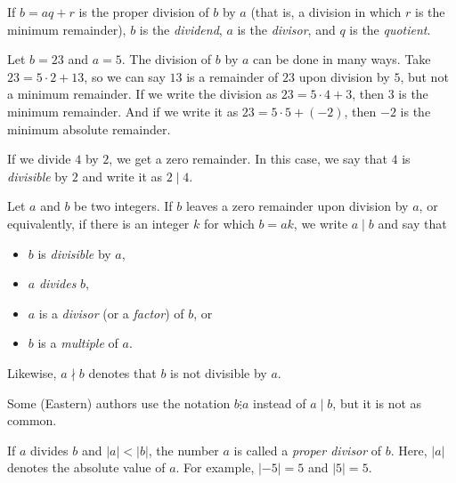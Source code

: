 
\begin{definition}
	If $b=aq+r$ is the proper division of $b$ by $a$ (that is, a division in which $r$ is the minimum remainder), $b$ is the \textit{dividend}, $a$ is the \textit{divisor}, and $q$ is the \textit{quotient}.
\end{definition}

\begin{example}
	Let $b=23$ and $a=5$. The division of $b$ by $a$ can be done in many ways. Take $23=5\cdot2+13$, so we can say $13$ is a remainder of $23$ upon division by $5$, but not a minimum remainder. If we write the division as $23=5\cdot4+3$, then $3$ is the minimum remainder. And if we write it as $23=5\cdot5+(-2)$, then $-2$ is the minimum absolute remainder.
\end{example}

If we divide $4$ by $2$, we get a zero remainder. In this case, we say that $4$ is \textit{divisible} by $2$ and write it as $2\mid 4$.

\begin{definition}
	Let $a$ and $b$ be two integers. If $b$ leaves a zero remainder upon division by $a$, or equivalently, if there is an integer $k$ for which $b=ak$, we write $a \mid b$ and say that
	\begin{itemize}
		\item $b$ is \textit{divisible} by $a$,
		\item $a$ \textit{divides} $b$,
		\item $a$ is a \textit{divisor} (or a \textit{factor}) of $b$, or
		\item $b$ is a \textit{multiple} of $a$.
	\end{itemize}
	Likewise, $a\nmid b$ denotes that $b$ is not divisible by $a$.
\end{definition}

\begin{remark}
	Some (Eastern) authors use the notation $b\vdots a$ instead of $a\mid b$, but it is not as common.
\end{remark}

\begin{definition}
	If $a$ divides $b$ and $|a|<|b|$, the number $a$ is called a \textit{proper divisor} of $b$. Here, $|a|$ denotes the absolute value of $a$. For example, $|-5|=5$ and $|5|=5$.
\end{definition}


